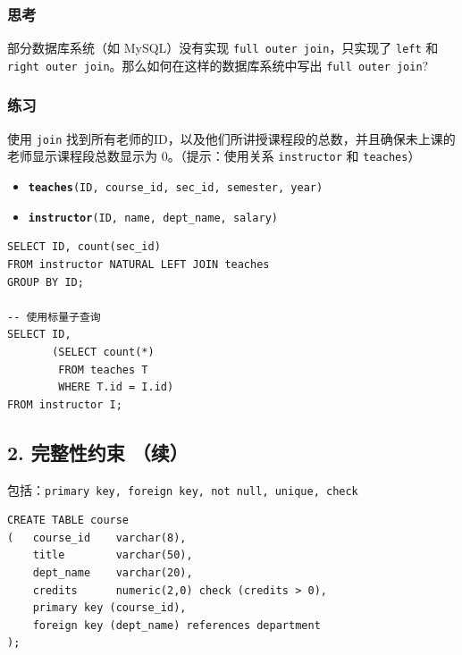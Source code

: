 \documentclass[aspectratio=169, 14pt]{beamer}
\begin{document}
\begin{frame}
    \frametitle{思考}

    部分数据库系统（如 MySQL）没有实现 \texttt{full outer join}，只实现了 \texttt{left} 和 \texttt{right outer join}。那么如何在这样的数据库系统中写出 \texttt{full outer join}?

\end{frame}

\begin{frame}
    \frametitle{练习}
使用 \texttt{join} 找到所有老师的ID，以及他们所讲授课程段的总数，并且确保未上课的老师显示课程段总数显示为 0。（提示：使用关系 \texttt{instructor} 和 \texttt{teaches}）

\begin{itemize}
    \item \texttt{\textbf{teaches}(ID, course\_id, sec\_id, semester, year)}
    \item \texttt{\textbf{instructor}(ID, name, dept\_name, salary)}
\end{itemize}
    
\end{frame}

\begin{frame}[fragile]

    \begin{verbatim}
SELECT ID, count(sec_id)
FROM instructor NATURAL LEFT JOIN teaches
GROUP BY ID;

-- 使用标量子查询
SELECT ID,
       (SELECT count(*)
        FROM teaches T
        WHERE T.id = I.id)
FROM instructor I;
    \end{verbatim}
\end{frame}

\begin{frame}
    \section{\textcolor{darkmidnightblue}{2. 完整性约束 （续）}}
    包括：\texttt{primary key, foreign key, not null, unique, check}

\end{frame}

\begin{frame}[fragile]

    \begin{verbatim}
CREATE TABLE course
(   course_id    varchar(8), 
    title        varchar(50), 
    dept_name    varchar(20),
    credits      numeric(2,0) check (credits > 0),
    primary key (course_id),
    foreign key (dept_name) references department
);
    \end{verbatim}

\end{frame}
\end{document}
